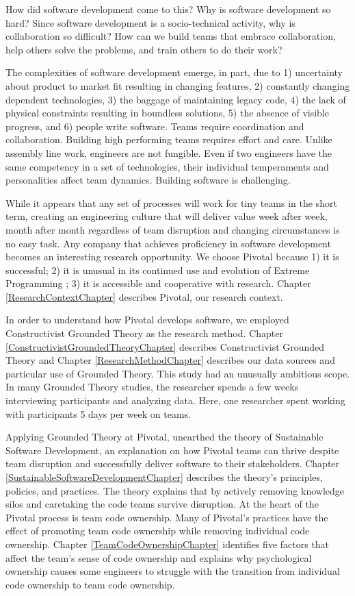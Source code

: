 How did software development come to this? Why is software development so hard? Since software development is a socio-technical activity, why is collaboration so difficult? How can we build teams that embrace collaboration, help others solve the problems, and train others to do their work?


The complexities of software development emerge, in part, due to 1) uncertainty about product to market fit resulting in changing features, 2) constantly changing dependent technologies, 3) the baggage of maintaining legacy code, 4) the lack of physical constraints resulting in boundless solutions, 5) the absence of visible progress, and 6) people write software. Teams require coordination and collaboration. Building high performing teams requires effort and care. Unlike assembly line work, engineers are not fungible. Even if two engineers have the same competency in a set of technologies, their individual temperaments and personalities affect team dynamics. Building software is challenging. 


While it appears that any set of processes will work for tiny teams in the short term, creating an engineering culture that will deliver value week after week, month after month regardless of team disruption and changing circumstances is no easy task. Any company that achieves proficiency in software development becomes an interesting research opportunity. We choose Pivotal because 1) it is successful; 2) it is unusual in its continued use and evolution of Extreme Programming \cite{BeckExtremeProgramming2004}; 3) it is accessible and cooperative with research. Chapter \ref{ResearchContextChapter} describes Pivotal, our research context. 


In order to understand how Pivotal develops software, we employed Constructivist Grounded Theory as the research method. Chapter \ref{ConstructivistGroundedTheoryChapter} describes Constructivist Grounded Theory and Chapter \ref{ResearchMethodChapter} describes our data sources and particular use of Grounded Theory. This study had an unusually ambitious scope. In many Grounded Theory studies, the researcher spends a few weeks interviewing participants and analyzing data. Here, one researcher spent \durationOfResearchStudyPlural{} working with participants 5 days per week on \numberOfObservedProjects{} teams. 


Applying Grounded Theory at Pivotal, unearthed the theory of Sustainable Software Development, an explanation on how Pivotal teams can thrive despite team disruption and successfully deliver software to their stakeholders. Chapter \ref{SustainableSoftwareDevelopmentChapter} describes the theory’s principles, policies, and practices. The theory explains that by actively removing knowledge silos and caretaking the code teams survive disruption. At the heart of the Pivotal process is team code ownership. Many of Pivotal’s practices have the effect of promoting team code ownership while removing individual code ownership. Chapter \ref{TeamCodeOwnershipChapter} identifies five factors that affect the team’s sense of code ownership and explains why psychological ownership causes some engineers to struggle with the transition from individual code ownership to team code ownership. 


